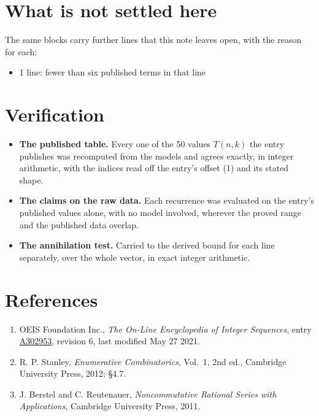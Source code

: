 \documentclass[11pt]{article}
\theoremstyle{definition}
\begin{document}
\section{What is not settled here}

The same blocks carry further lines that this note leaves open, with the reason for each:

\begin{itemize}

\item 1 line: fewer than six published terms in that line

\end{itemize}

\section{Verification}

\begin{itemize}

\item {\bfseries The published table.} Every one of the 50 values $T(n,k)$ the entry publishes was recomputed from the models and agrees exactly, in integer arithmetic, with the indices read off the entry's offset (1) and its stated shape.

\item {\bfseries The claims on the raw data.} Each recurrence was evaluated on the entry's published values alone, with no model involved, wherever the proved range and the published data overlap.

\item {\bfseries The annihilation test.} Carried to the derived bound for each line separately, over the whole vector, in exact integer arithmetic.

\end{itemize}

\section{References}

\begin{enumerate}

\item OEIS Foundation Inc., \emph{The On-Line Encyclopedia of Integer Sequences}, entry \href{https://oeis.org/A302953}{A302953}, revision 6, last modified May 27 2021.

\item R. P. Stanley, \emph{Enumerative Combinatorics}, Vol.~1, 2nd ed., Cambridge University Press, 2012; \S4.7.

\item J. Berstel and C. Reutenauer, \emph{Noncommutative Rational Series with Applications}, Cambridge University Press, 2011.

\end{enumerate}
\end{document}
